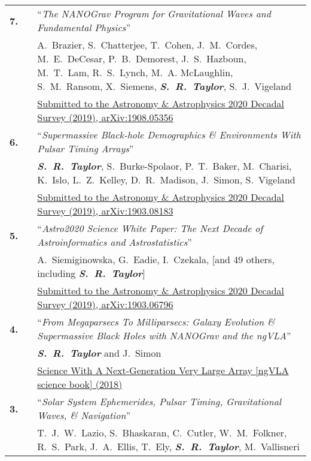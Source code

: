 \documentclass[11pt,letterpaper,sans]{moderncv}
\begin{document}
{\begin{longtable}{rp{0.3cm}p{15.8cm}}
\textbf{7.} & & ``\textit{The NANOGrav Program for Gravitational Waves and Fundamental Physics}'' \\ 
&& A.~Brazier, S.~Chatterjee, T.~Cohen, J.~M.~Cordes, M.~E.~DeCesar, P.~B.~Demorest, J.~S.~Hazboun, M.~T.~Lam, R.~S.~Lynch, M.~A. McLaughlin, S.~M.~Ransom, X.~Siemens, \textit{\textbf{S.~R.~Taylor}}, S.~J.~Vigeland \\ 
&& {\color{color1} \href{https://arxiv.org/abs/1908.05356}{Submitted to the Astronomy \& Astrophysics 2020 Decadal Survey (2019), arXiv:1908.05356}} \vspace{0.09cm}\\
\textbf{6.} & & ``\textit{Supermassive Black-hole Demographics \& Environments With Pulsar Timing Arrays}'' \\ 
&& \textit{\textbf{S.~R.~Taylor}}, S.~Burke-Spolaor, P.~T.~Baker, M.~Charisi, K.~Islo, L.~Z.~Kelley, D.~R.~Madison, J.~Simon, S.~Vigeland \\ 
&& {\color{color1} \href{https://arxiv.org/abs/1903.08183}{Submitted to the Astronomy \& Astrophysics 2020 Decadal Survey (2019), arXiv:1903.08183}} \vspace{0.09cm}\\
\textbf{5.} & & ``\textit{Astro2020 Science White Paper: The Next Decade of Astroinformatics and Astrostatistics}'' \\ 
&& A.~Siemiginowska, G.~Eadie, I.~Czekala, [and 49 others, including \textit{\textbf{S.~R.~Taylor}}] \\ 
&& {\color{color1} \href{https://arxiv.org/abs/1903.06796}{Submitted to the Astronomy \& Astrophysics 2020 Decadal Survey (2019), arXiv:1903.06796}} \vspace{0.09cm}\\
\textbf{4.} & & ``\textit{From Megaparsecs To Milliparsecs: Galaxy Evolution \& Supermassive Black Holes with NANOGrav and the ngVLA}'' \\ 
&& \textit{\textbf{S.~R.~Taylor}} and J.~Simon \\ 
&& \href{http://ngvla.nrao.edu/page/scibook}{{\color{color1} Science With A Next-Generation Very Large Array [ngVLA science book] (2018)}} \vspace{0.09cm}\\
\textbf{3.} & & ``\textit{Solar System Ephemerides, Pulsar Timing, Gravitational Waves, \& Navigation}'' \\ 
&& T.~J.~W.~Lazio, S.~Bhaskaran, C.~Cutler, W.~M.~Folkner, R.~S.~Park, J.~A.~Ellis, T.~Ely, \textit{\textbf{S.~R.~Taylor}}, M.~Vallisneri \\ 

\end{longtable}}
\end{document}

